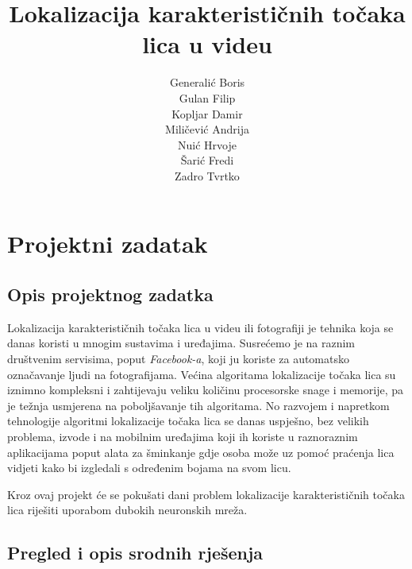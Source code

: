 \documentclass[times, utf8, zavrsni, numeric]{fer}
\begin{document}
\title{ Lokalizacija karakterističnih točaka lica u videu }

\author{ \begin{tabular}{ l }
	Generalić Boris \\
	Gulan Filip \\
	Kopljar Damir \\
	Miličević Andrija \\
	Nuić Hrvoje \\
	Šarić Fredi \\
	Zadro Tvrtko \\
\end{tabular}  }

\maketitle
\tableofcontents

\chapter{Projektni zadatak}

\section{Opis projektnog zadatka}

Lokalizacija karakterističnih točaka lica u videu ili fotografiji je tehnika koja se danas koristi u mnogim sustavima i uređajima. Susrećemo je na raznim društvenim servisima, poput \textit{Facebook-a}, koji ju koriste za automatsko označavanje ljudi na fotografijama. Većina algoritama lokalizacije točaka lica su iznimno kompleksni i zahtijevaju veliku količinu procesorske snage i memorije, pa je težnja usmjerena na poboljšavanje tih algoritama. No razvojem i napretkom tehnologije algoritmi lokalizacije točaka lica se danas uspješno, bez velikih problema, izvode i na mobilnim uređajima koji ih koriste u raznoraznim aplikacijama poput alata za šminkanje gdje osoba može uz pomoć praćenja lica vidjeti kako bi izgledali s određenim bojama na svom licu.

Kroz ovaj projekt će se pokušati dani problem lokalizacije karakterističnih točaka lica riješiti uporabom dubokih neuronskih mreža.

\section{Pregled i opis srodnih rješenja}

\end{document}
